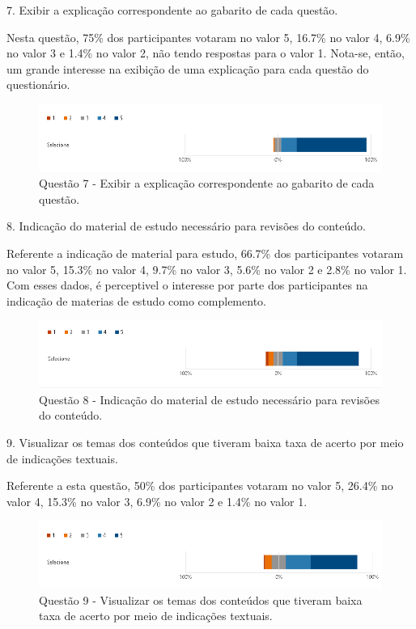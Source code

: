 7. Exibir a explicação correspondente ao gabarito de cada questão.

Nesta questão, 75\% dos participantes votaram no valor 5, 16.7\% no valor 4, 6.9\% no valor 3 e 1.4\% no valor 2, não tendo respostas para o valor 1. Nota-se, então, um grande interesse na exibição de uma explicação para cada questão do questionário.

\begin{figure}[H]
\centering
\caption{Questão 7 - Exibir a explicação correspondente ao gabarito de cada questão.}
\includegraphics[scale=0.6]{figuras/7.png}
\end{figure}


8. Indicação do material de estudo necessário para revisões do conteúdo.

Referente a indicação de material para estudo, 66.7\% dos participantes votaram no valor 5, 15.3\% no valor 4, 9.7\% no valor 3, 5.6\% no valor 2 e 2.8\% no valor 1. Com esses dados, é perceptivel o interesse por parte dos participantes na indicação de materias de estudo como complemento.

\begin{figure}[H]
\centering
\caption{Questão 8 - Indicação do material de estudo necessário para revisões do conteúdo.}
\includegraphics[scale=0.6]{figuras/8.png}
\end{figure}

9. Visualizar os temas dos conteúdos que tiveram baixa taxa de acerto por meio de indicações textuais.

Referente a esta questão, 50\% dos participantes votaram no valor 5, 26.4\% no valor 4, 15.3\% no valor 3, 6.9\% no valor 2 e 1.4\% no valor 1.

\begin{figure}[H]
\centering
\caption{Questão 9 - Visualizar os temas dos conteúdos que tiveram baixa taxa de acerto por meio de indicações textuais.}
\includegraphics[scale=0.6]{figuras/9.png}
\end{figure}

